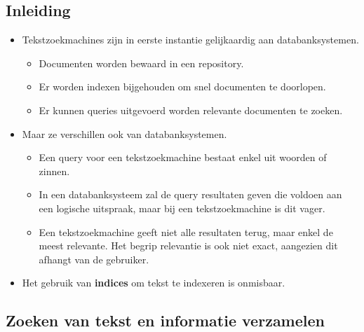 \subsection{Inleiding}
\begin{itemize}
    \item Tekstzoekmachines zijn in eerste instantie gelijkaardig aan databanksystemen.
    \begin{itemize}
        \item Documenten worden bewaard in een repository.
        \item Er worden indexen bijgehouden om snel documenten te doorlopen.
        \item Er kunnen queries uitgevoerd worden relevante documenten te zoeken.
    \end{itemize}
    \item Maar ze verschillen ook van databanksystemen.
    \begin{itemize}
        \item Een query voor een tekstzoekmachine bestaat enkel uit woorden of zinnen.
        \item In een databanksysteem zal de query resultaten geven die voldoen aan een logische uitspraak, maar bij een tekstzoekmachine is dit vager.
        \item Een tekstzoekmachine geeft niet alle resultaten terug, maar enkel de meest relevante. Het begrip relevantie is ook niet exact, aangezien dit afhangt van de gebruiker.
    \end{itemize}
    \item Het gebruik van \textbf{indices} om tekst te indexeren is onmisbaar.
\end{itemize}

\subsection{Zoeken van tekst en informatie verzamelen}
